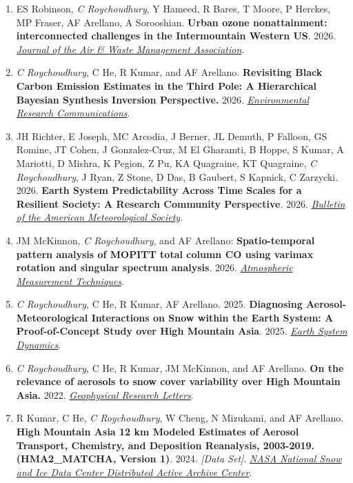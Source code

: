 \documentclass[margin,line]{resume}
\begin{document}
\begin{resume}
\begin{enumerate}[topsep=1pt, partopsep=1pt, itemsep=0.5pt, parsep=0.1pt, leftmargin=15pt,label=\arabic*.]
			\item ES Robinson, \textit{C Roychoudhury}, Y Hameed, R Bares, T Moore, P Herckes, MP Fraser, AF Arellano, A Sorooshian. \textbf{Urban ozone nonattainment: interconnected challenges in the Intermountain Western US}. 2026. \textit{\href{https://doi.org/10.1080/10962247.2026.2694482}{Journal of the Air \& Waste Management Association}}.
			
			\item \textit{C Roychoudhury}, C He, R Kumar, and AF Arellano. \textbf{Revisiting Black Carbon Emission Estimates in the Third Pole: A Hierarchical Bayesian Synthesis Inversion Perspective.} 2026. \textit{\href{https://iopscience.iop.org/article/10.1088/2515-7620/ae4858}{Environmental Research Communications}}.
			
			\item JH Richter, E Joseph, MC Arcodia, J Berner, JL Demuth, P Falloon, GS Romine, JT Cohen, J Gonzalez-Cruz, M El Gharamti, B Hoppe, S Kumar, A Mariotti, D Mishra, K Pegion, Z Pu, KA Quagraine, KT Quagraine, \textit{C Roychoudhury}, J Ryan, Z Stone, D Das, B Gaubert, S Kapnick, C Zarzycki. 2026. \textbf{Earth System Predictability Across Time Scales for a Resilient Society: A Research Community Perspective}. 2026. \emph{\href{https://journals.ametsoc.org/view/journals/bams/aop/BAMS-D-24-0155.1/BAMS-D-24-0155.1.xml}{Bulletin of the American Meteorological Society}}. 
			
			\item JM McKinnon,\textit{ C Roychoudhury}, and AF Arellano: \textbf{Spatio-temporal pattern analysis of MOPITT total column CO using varimax rotation and singular spectrum analysis}. 2026.  \textit{\href{https://amt.copernicus.org/articles/19/2529/2026/}{Atmospheric Measurement Techniques}}.
			
			\item \textit{C Roychoudhury}, C He, R Kumar, AF Arellano. 2025.  \textbf{Diagnosing Aerosol-Meteorological Interactions on Snow within the Earth System: A Proof-of-Concept Study over High Mountain Asia}. 2025.  \emph{\href{https://esd.copernicus.org/articles/16/1237/2025/}{Earth System Dynamics}}.
			
			\item \textit{C Roychoudhury}, C He, R Kumar, JM McKinnon, and AF Arellano. \textbf{On the relevance of aerosols to snow cover variability over High Mountain Asia.} 2022.  \href{https://doi.org/10.1029/2022GL099317}{\textit{Geophysical Research Letters}}.
			
			\item R Kumar, C He, \textit{C Roychoudhury}, W Cheng, N Mizukami, and AF Arellano. \textbf{High Mountain Asia 12 km Modeled Estimates of Aerosol Transport, Chemistry, and Deposition Reanalysis, 2003-2019. (HMA2\_MATCHA, Version 1)}. 2024. \textit{[Data Set]}. \href{https://doi.org/10.5067/CG4OT8DJX2Z7}{\textit{NASA National Snow and Ice Data Center Distributed Active Archive Center}}.
			

\end{enumerate}
\end{resume}
\end{document}
